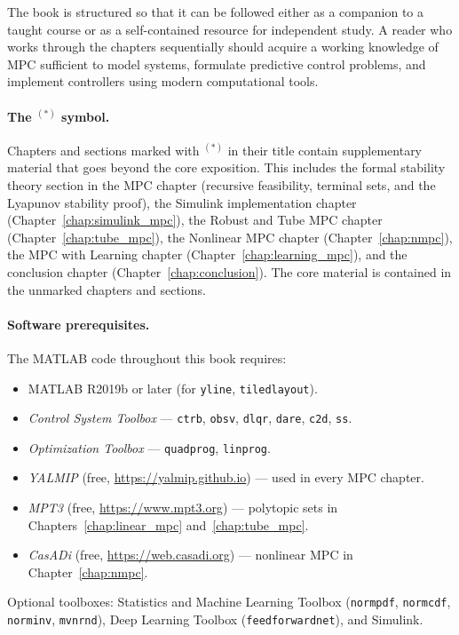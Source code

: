 The book is structured so that it can be followed either as a companion to a taught course or as a self-contained resource for independent study. A reader who works through the chapters sequentially should acquire a working knowledge of MPC sufficient to model systems, formulate predictive control problems, and implement controllers using modern computational tools.

\paragraph{The $^{(*)}$ symbol.} Chapters and sections marked with $^{(*)}$ in their title contain supplementary material that goes beyond the core exposition. This includes the formal stability theory section in the MPC chapter (recursive feasibility, terminal sets, and the Lyapunov stability proof), the Simulink implementation chapter (Chapter~\ref{chap:simulink_mpc}), the Robust and Tube MPC chapter (Chapter~\ref{chap:tube_mpc}), the Nonlinear MPC chapter (Chapter~\ref{chap:nmpc}), the MPC with Learning chapter (Chapter~\ref{chap:learning_mpc}), and the conclusion chapter (Chapter~\ref{chap:conclusion}). The core material is contained in the unmarked chapters and sections.

\paragraph{Software prerequisites.}
The MATLAB code throughout this book requires:
\begin{itemize}[noitemsep]
  \item MATLAB R2019b or later (for \texttt{yline}, \texttt{tiledlayout}).
  \item \emph{Control System Toolbox} --- \texttt{ctrb}, \texttt{obsv}, \texttt{dlqr}, \texttt{dare}, \texttt{c2d}, \texttt{ss}.
  \item \emph{Optimization Toolbox} --- \texttt{quadprog}, \texttt{linprog}.
  \item \emph{YALMIP} (free, \url{https://yalmip.github.io}) --- used in every MPC chapter.
  \item \emph{MPT3} (free, \url{https://www.mpt3.org}) --- polytopic sets in Chapters~\ref{chap:linear_mpc} and~\ref{chap:tube_mpc}.
  \item \emph{CasADi} (free, \url{https://web.casadi.org}) --- nonlinear MPC in Chapter~\ref{chap:nmpc}.
\end{itemize}
Optional toolboxes: Statistics and Machine Learning Toolbox (\texttt{normpdf}, \texttt{normcdf}, \texttt{norminv}, \texttt{mvnrnd}), Deep Learning Toolbox (\texttt{feedforwardnet}), and Simulink.

